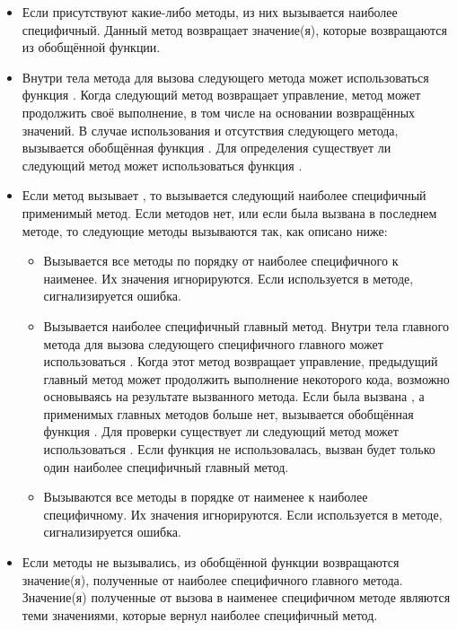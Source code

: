 \begin{itemize}

\item Если присутствуют какие-либо  методы, из них вызывается
  наиболее специфичный. Данный метод возвращает значение(я), которые
  возвращаются из обобщённой функции.

\item Внутри тела  метода для вызова следующего метода может
  использоваться функция . Когда следующий метод
  возвращает управление,  метод может продолжить своё выполнение, в
  том числе на основании возвращённых значений. В случае использования
   и отсутствия следующего метода, вызывается обобщённая
  функция . Для определения существует ли следующий метод
  может использоваться функция .

\item Если  метод вызывает , то вызывается
  следующий наиболее специфичный  применимый метод. Если
   методов нет, или если  была вызвана в
  последнем  методе, то следующие методы вызываются так, как описано
  ниже:

\begin{itemize}

\item Вызывается все  методы по порядку от наиболее специфичного к
  наименее. Их значения игнорируются. Если  используется в
   методе, сигнализируется ошибка.

\item Вызывается наиболее специфичный главный метод. Внутри тела главного метода
  для вызова следующего специфичного главного может использоваться
  . Когда этот метод возвращает управление, предыдущий
  главный метод может продолжить выполнение некоторого кода, возможно
  основываясь на результате вызванного метода. Если была вызвана
  , а применимых главных методов больше нет, вызывается
  обобщённая функция . Для проверки существует ли следующий
  метод может использоваться . Если функция
   не использовалась, вызван будет только один наиболее
  специфичный главный метод.

\item Вызываются все  методы в порядке от наименее к
  наиболее специфичному. Их значения игнорируются. Если 
  используется в  методе, сигнализируется ошибка.
\end{itemize}

\item Если  методы не вызывались, из обобщённой функции возвращаются
  значение(я), полученные от наиболее специфичного главного метода. Значение(я)
  полученные от вызова  в наименее специфичном 
  методе являются теми значениями, которые вернул наиболее специфичный метод.
\end{itemize}

